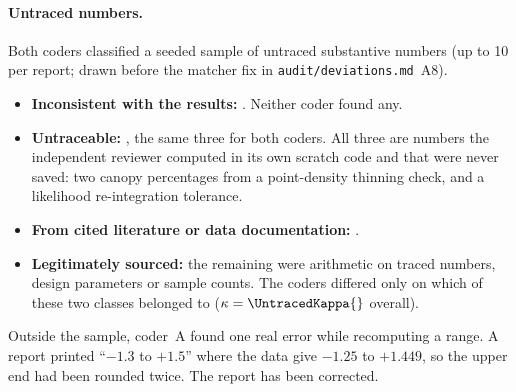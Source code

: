 \paragraph{Untraced numbers.} Both coders classified a seeded sample of \UntracedN{} untraced substantive numbers
(up to 10 per report; drawn before the matcher fix in \texttt{audit/deviations.md}~A8).
\begin{itemize}
\item \textbf{Inconsistent with the results:} \UntracedUFiveAny{}. Neither coder found any.
\item \textbf{Untraceable:} \UntracedUFourBoth{}, the same three for both coders. All three are numbers the
independent reviewer computed in its own scratch code and that were never saved: two canopy percentages from a
point-density thinning check, and a likelihood re-integration tolerance.
\item \textbf{From cited literature or data documentation:} \UntracedUTwo{}.
\item \textbf{Legitimately sourced:} the remaining \UntracedOneThree{} were arithmetic on traced numbers, design
parameters or sample counts. The coders differed only on which of these two classes \UntracedOneThreeDisagree{}
belonged to ($\kappa=\UntracedKappa{}$ overall).
\end{itemize}

Outside the sample, coder~A found one real error while recomputing a range. A report printed ``$-1.3$ to $+1.5$''
where the data give $-1.25$ to $+1.449$, so the upper end had been rounded twice. The report has been corrected.
